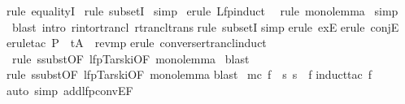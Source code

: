 \begin{isabellebody}
rule\ equalityI{\isacharparenright}\isanewline
\ rule\ subsetI{\isacharparenright}\isanewline
\ simp{\isacharparenright}\isanewline
\ erule\ Lfp{\isachardot}induct{\isacharparenright}\isanewline
\ \ rule\ mono{\isacharunderscore}lemma{\isacharparenright}\isanewline
\ simp{\isacharparenright}\isanewline
\ blast\ intro{\isacharcolon}\ r{\isacharunderscore}into{\isacharunderscore}rtrancl\ rtrancl{\isacharunderscore}trans{\isacharparenright}\isanewline
{}rule\ subsetI{\isacharparenright}\isanewline
{}simp{\isacharparenright}\isanewline
{}erule\ exE{\isacharparenright}\isanewline
{}erule\ conjE{\isacharparenright}\isanewline
{}erule{\isacharunderscore}tac\ P\ {\isacharequal}\ {\isachardoublequote}t{\isasymin}A{\isachardoublequote}\ \ rev{\isacharunderscore}mp{\isacharparenright}\isanewline
{}erule\ converse{\isacharunderscore}rtrancl{\isacharunderscore}induct{\isacharparenright}\isanewline
\ rule\ ssubst{\isacharbrackleft}OF\ lfp{\isacharunderscore}Tarski{\isacharbrackleft}OF\ mono{\isacharunderscore}lemma{\isacharbrackright}{\isacharbrackright}{\isacharparenright}\isanewline
\ blast{\isacharparenright}\isanewline
{}rule\ ssubst{\isacharbrackleft}OF\ lfp{\isacharunderscore}Tarski{\isacharbrackleft}OF\ mono{\isacharunderscore}lemma{\isacharbrackright}{\isacharbrackright}{\isacharparenright}\isanewline
{}blast{\isacharparenright}\isanewline
\isanewline
{}\ {\isachardoublequote}mc\ f\ {\isacharequal}\ {\isacharbraceleft}s{\isachardot}\ s\ {\isasymTurnstile}\ f{\isacharbraceright}{\isachardoublequote}\isanewline
{}induct{\isacharunderscore}tac\ f{\isacharparenright}\isanewline
{}auto\ simp\ add{\isacharcolon}lfp{\isacharunderscore}conv{\isacharunderscore}EF{\isacharparenright}\isanewline
\isanewline
{}\isanewline
\end{isabellebody}%
